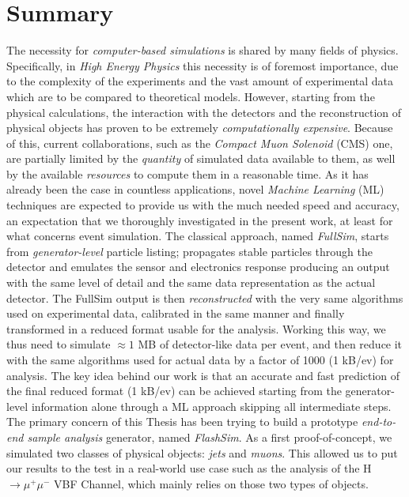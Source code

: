 \begingroup
\let\clearpage\relax
\let\cleardoublepage\relax
\let\cleardoublepage\relax

\chapter*{Summary}
The necessity for \emph{computer-based simulations} is shared by many fields of physics. Specifically, in \emph{High Energy Physics} this necessity is of foremost importance, due to the complexity of the experiments and the vast amount of experimental data which are to be compared to theoretical models. However, starting from the physical calculations, the interaction with the detectors and the reconstruction of physical objects has proven to be extremely \emph{computationally expensive}. Because of this, current collaborations, such as the \emph{Compact Muon Solenoid} (CMS) one, are partially limited by the \emph{quantity} of simulated data available to them, as well by the available \emph{resources} to compute them in a reasonable time. As it has already been the case in countless applications, novel \emph{Machine Learning} (ML) techniques are expected to provide us with the much needed speed and accuracy, an expectation that we thoroughly investigated in the present work, at least for what concerns event simulation. 
The classical approach, named \emph{FullSim}, starts from \emph{generator-level} particle listing; propagates stable particles through the detector and emulates the sensor and electronics response producing an output with the same level of detail and the same data representation as the actual detector. The FullSim output is then \emph{reconstructed} with the very same algorithms used on experimental data, calibrated in the same manner and finally transformed in a reduced format usable for the analysis. Working this way, we thus need to simulate $\approx 1$ MB of detector-like data per event, and then reduce it with the same algorithms used for actual data by a factor of 1000 (1 kB/ev) for analysis.
The key idea behind our work is that an accurate and fast prediction of the final reduced format (1 kB/ev) can be achieved starting from the generator-level information alone through a ML approach skipping all intermediate steps. The primary concern of this Thesis has been trying to build a prototype \emph{end-to-end sample analysis} generator, named \emph{FlashSim}.
As a first proof-of-concept, we simulated two classes of physical objects: \emph{jets} and \emph{muons}. This allowed us to put our results to the test in a real-world use case such as the analysis of the H$\rightarrow\mu^+\mu^-$ VBF Channel, which mainly relies on those two types of objects.


